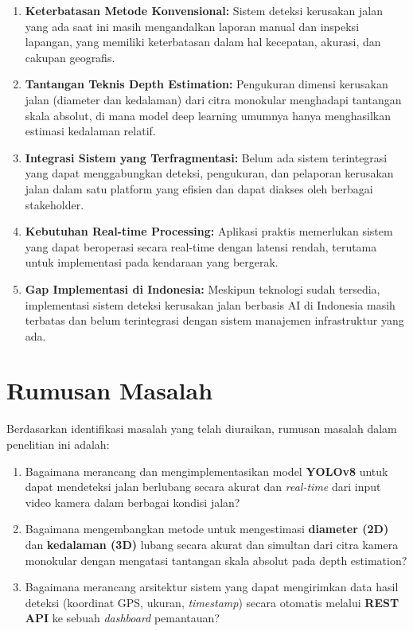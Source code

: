 \documentclass[12pt,a4paper]{report}
\begin{document}
\begin{enumerate}
    \item \textbf{Keterbatasan Metode Konvensional:} Sistem deteksi kerusakan jalan yang ada saat ini masih mengandalkan laporan manual dan inspeksi lapangan, yang memiliki keterbatasan dalam hal kecepatan, akurasi, dan cakupan geografis.
    
    \item \textbf{Tantangan Teknis Depth Estimation:} Pengukuran dimensi kerusakan jalan (diameter dan kedalaman) dari citra monokular menghadapi tantangan skala absolut, di mana model deep learning umumnya hanya menghasilkan estimasi kedalaman relatif.
    
    \item \textbf{Integrasi Sistem yang Terfragmentasi:} Belum ada sistem terintegrasi yang dapat menggabungkan deteksi, pengukuran, dan pelaporan kerusakan jalan dalam satu platform yang efisien dan dapat diakses oleh berbagai stakeholder.
    
    \item \textbf{Kebutuhan Real-time Processing:} Aplikasi praktis memerlukan sistem yang dapat beroperasi secara real-time dengan latensi rendah, terutama untuk implementasi pada kendaraan yang bergerak.
    
    \item \textbf{Gap Implementasi di Indonesia:} Meskipun teknologi sudah tersedia, implementasi sistem deteksi kerusakan jalan berbasis AI di Indonesia masih terbatas dan belum terintegrasi dengan sistem manajemen infrastruktur yang ada.
\end{enumerate}

\section{Rumusan Masalah}

Berdasarkan identifikasi masalah yang telah diuraikan, rumusan masalah dalam penelitian ini adalah:

\begin{enumerate}
    \item Bagaimana merancang dan mengimplementasikan model \textbf{YOLOv8} untuk dapat mendeteksi jalan berlubang secara akurat dan \textit{real-time} dari input video kamera dalam berbagai kondisi jalan?
    
    \item Bagaimana mengembangkan metode untuk mengestimasi \textbf{diameter (2D)} dan \textbf{kedalaman (3D)} lubang secara akurat dan simultan dari citra kamera monokular dengan mengatasi tantangan skala absolut pada depth estimation?
    
    \item Bagaimana merancang arsitektur sistem yang dapat mengirimkan data hasil deteksi (koordinat GPS, ukuran, \textit{timestamp}) secara otomatis melalui \textbf{REST API} ke sebuah \textit{dashboard} pemantauan?
\end{enumerate}
\end{document}
